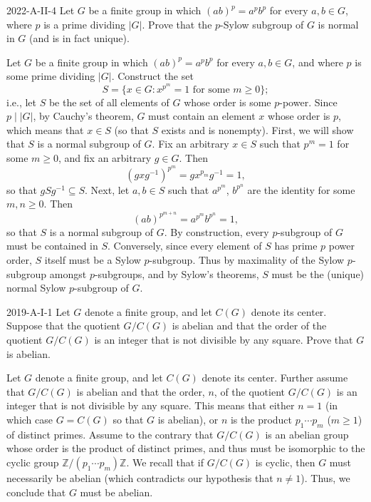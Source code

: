 \documentclass{article}
\begin{document}
	\begin{prb}{2022-A-II-4}
		Let $G$ be a finite group in which $(ab)^{p} = a^{p}b^{p}$ for every $a, b \in G$, where $p$ is a prime dividing $|G|$. Prove that the $p$-Sylow subgroup of $G$ is normal in $G$ (and is in fact unique). 
	\end{prb}
	Let $G$ be a finite group in which $(ab)^{p} = a^{p}b^{p}$ for every $a, b \in G$, and where $p$ is some prime dividing $|G|$. Construct the set 
	\begin{equation*}
		S = \{x \in G: x^{p^{m}} = 1 \text{ for some $m \geq 0$}\}; 
	\end{equation*}
	i.e., let $S$ be the set of all elements of $G$ whose order is some $p$-power. Since $p \mid |G|$, by Cauchy's theorem, $G$ must contain an element $x$ whose order is $p$, which means that $x \in S$ (so that $S$ exists and is nonempty). First, we will show that $S$ is a normal subgroup of $G$. Fix an arbitrary $x \in S$ such that $p^{m} = 1$ for some $m \geq 0$, and fix an arbitrary $g \in G$. Then 
	\begin{equation*}
		(gxg^{-1})^{p^{m}} = gx^{p_{m}}g^{-1} = 1, 
	\end{equation*}
	so that $gSg^{-1} \subseteq S$. Next, let $a,b \in S$ such that $a^{p^{m}}$, $b^{p^{n}}$ are the identity for some $m, n \geq 0$. Then 
	\begin{equation*}
		(ab)^{p^{m + n}} = a^{p^{m}}b^{p^{n}} = 1, 
	\end{equation*}
	so that $S$ is a normal subgroup of $G$. By construction, every $p$-subgroup of $G$ must be contained in $S$. Conversely, since every element of $S$ has prime $p$ power order, $S$ itself must be a Sylow $p$-subgroup. Thus by maximality of the Sylow $p$-subgroup amongst $p$-subgroups, and by Sylow's theorems, $S$ must be the (unique) normal Sylow $p$-subgroup of $G$. 
	
	\begin{prb}{2019-A-I-1}
		Let $G$ denote a finite group, and let $C(G)$ denote its center. Suppose that the quotient $G/C(G)$ is abelian and that the order of the quotient $G/C(G)$ is an integer that is not divisible by any square. Prove that $G$ is abelian. 
	\end{prb}
	Let $G$ denote a finite group, and let $C(G)$ denote its center. Further assume that $G/C(G)$ is abelian and that the order, $n$, of the quotient $G/C(G)$ is an integer that is not divisible by any square. This means that either $n = 1$ (in which case $G = C(G)$ so that $G$ is abelian), or $n$ is the product $p_{1}\dotsm p_{m}$ ($m \geq 1$) of distinct primes. Assume to the contrary that $G/C(G)$ is an abelian group whose order is the product of distinct primes, and thus must be isomorphic to the cyclic group $\mathbb{Z}/(p_1 \dotsm p_{m})\mathbb{Z}$. We recall that if $G/C(G)$ is cyclic, then $G$ must necessarily be abelian (which contradicts our hypothesis that $n \neq 1$). Thus, we conclude that $G$ must be abelian. 
	
\end{document}
